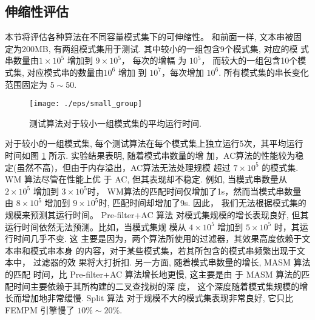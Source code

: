 \documentclass{ws-ijprai}
\begin{document}
\subsection{伸缩性评估}

本节将评估各种算法在不同容量模式集下的可伸缩性。 和前面一样, 文本串被固
定为200MB, 有两组模式集用于测试. 其中较小的一组包含9个模式集, 对应的模
式串数量由$1 \times 10^5$ 增加到 $9 \times 10^5$， 每次的增幅
为 $10^5$， 而较大的一组包含10个模式集, 对应模式串的数量由$10^6$ 增加
到 $10^7$，每次增加 $10^6$. 所有模式集的串长变化范围固定为 $5 \sim
50$.


\begin{figure}[htbp]
  \centering
  \texttt{[image: ./eps/small\_group]}
  \caption{测试算法对于较小一组模式集的平均运行时间.}
  \label{fig:small_group}
\end{figure}

对于较小的一组模式集, 每个测试算法在每个模式集上独立运行5次，其平均运行
时间如图 \ref{fig:small_group} 所示. 实验结果表明, 随着模式串数量的增
加，AC算法的性能较为稳定(虽然不高)，但由于内存溢出，AC算法无法处理规模
超过 $7 \times 10^5$ 的模式集. \textsf{WM} 算法尽管在性能上优
于 \textsf{AC}, 但其表现却不稳定. 例如, 当模式串数量从$2 \times 10^5$
增加到 $3 \times 10^5$时， WM算法的匹配时间仅增加了1s，然而当模式串数量
由 $8 \times 10^5$ 增加到 $9 \times 10^5$时, 匹配时间却增加了9s. 因此，
我们无法根据模式集的规模来预测其运行时间。 \textsf{Pre-filter+AC} 算法
对模式集规模的增长表现良好, 但其运行时间依然无法预测。比如，当模式集规
模从 $4 \times 10^5$ 增加到 $5 \times 10^5$ 时，其运行时间几乎不变. 这
主要是因为，两个算法所使用的过滤器，其效果高度依赖于文本串和模式串本身
的内容，对于某些模式集，若其所包含的模式串频繁出现于文本中， 过滤器的效
果将大打折扣. 另一方面, 随着模式串数量的增长, \textsf{MASM} 算法的匹配
时间，比 \textsf{Pre-filter+AC} 算法增长地更慢, 这主要是由
于 \textsf{MASM} 算法的匹配时间主要依赖于其所构建的二叉查找树的深
度， 这个深度随着模式集规模的增长而增加地非常缓慢. \textsf{Split} 算法
对于规模不大的模式集表现非常良好, 它只比 \textsf{FEMPM} 引擎慢了 $10\%
\sim 20\%$.
\end{document}
